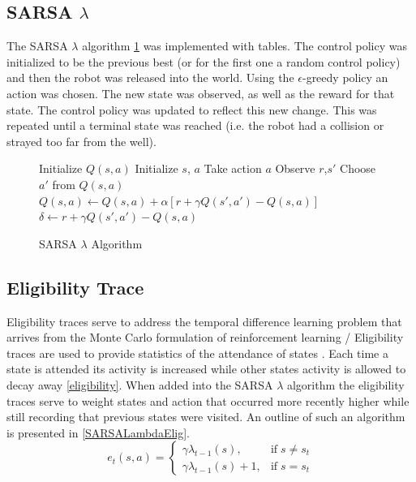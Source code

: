 \documentclass[conference]{IEEEtran}
\begin{document}
\subsection{SARSA $\lambda$}
The SARSA $\lambda$ algorithm \ref{SARSALambda} was implemented with tables. 
The control policy was initialized to be the previous best (or for the first one a random control policy) and then the robot was released into the world.
Using the $\epsilon$-greedy policy an action was chosen.  The new state was observed, as well as the reward for that state. The control policy was updated to reflect this new change.  This was repeated until a terminal state was reached (i.e. the robot had a collision or strayed too far from the well).
\begin{figure}
\begin{algorithmic}[1]
\State Initialize $Q(s,a)$
    \State Initialize $s$, $a$
        \State Take action $a$
        \State Observe $r$,$s'$
        \State Choose $a'$ from $Q(s,a)$
        \State $Q(s,a) \gets Q(s,a) + \alpha \left [r + \gamma Q(s',a')-Q(s,a) \right ]$
        \State $\delta \gets r + \gamma Q(s',a') - Q(s,a)$
    \EndWhile
\EndWhile
\end{algorithmic}
\caption{SARSA $\lambda$ Algorithm}
\label{SARSALambda}
\end{figure}
\subsection{Eligibility Trace}
Eligibility traces serve to address the temporal difference learning problem that arrives from the Monte Carlo formulation of reinforcement learning \cite{szepesvari_algorithms_2010}/
Eligibility traces are used to provide statistics of the attendance of states \cite{szepesvari_algorithms_2010}. 
Each time a state is attended its activity is increased while other states activity is allowed to decay away \eqref{eligibility}.
When added into the SARSA $\lambda$ algorithm the eligibility traces serve to weight states and action that occurred more recently higher while still recording that previous states were visited.
An outline of such an algorithm is presented in \ref{SARSALambdaElig}.
\begin{equation}
\label{eligiblity}
e_t (s,a) = 
\begin{cases}
\gamma\lambda_{t-1}(s), & \text{if} \; s \neq s_t \\
\gamma\lambda_{t-1}(s) +1,& \text{if} \; s = s_t
\end{cases}
\end{equation}
\end{document}
